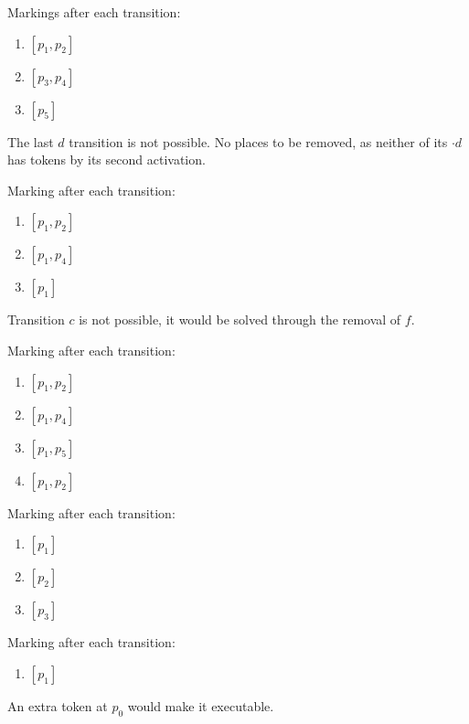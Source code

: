 \documentclass[a4paper]{report}
\begin{document}

Markings after each transition:
\begin{enumerate}
	\item $\left[  p_1,p_2\right] $
	\item $\left[  p_3,p_4\right] $
	\item $\left[ p_5 \right] $
\end{enumerate}
The last $d$ transition is not possible. No places to be removed, as neither of its $\cdot d$ has tokens by its second activation.


Marking after each transition:
\begin{enumerate}
	\item $\left[ p_1,p_2\right] $
	\item $\left[ p_1,p_4\right] $
	\item $\left[ p_1\right] $
\end{enumerate}
Transition $c$ is not possible, it would be solved through the removal of $f$.


Marking after each transition:
\begin{enumerate}
	\item $\left[ p_1,p_2\right] $
	\item $\left[ p_1,p_4\right] $
	\item $\left[ p_1, p_5\right] $
	\item $\left[ p_1,p_2\right] $
\end{enumerate}

Marking after each transition:
\begin{enumerate}
	\item $\left[ p_1\right] $
	\item $\left[ p_2\right] $
	\item $\left[ p_3\right] $
\end{enumerate}


Marking after each transition:
\begin{enumerate}
	\item $\left[ p_1\right] $
\end{enumerate}
An extra token at $p_0$ would make it executable.
\end{document}
